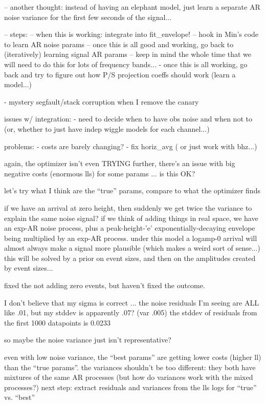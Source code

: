 \documentclass{article}
\begin{document}
-- another thought: instead of having an elephant model, just learn a separate AR noise variance for the first few seconds of the signal...
 
-- steps:
-- when this is working: integrate into fit_envelope!
-- hook in Min's code to learn AR noise params
-- once this is all good and working, go back to (iteratively) learning signal AR params
-- keep in mind the whole time that we will need to do this for lots of frequency bands...
- once this is all working, go back and try to figure out how P/S projection coeffs should work (learn a model...)


- mystery segfault/stack corruption when I remove the canary


issues w/ integration:
- need to decide when to have obs noise and when not to (or, whether to just have indep wiggle models for each channel...)

problems:
- costs are barely changing?
- fix horiz_avg ( or just work with bhz...)


again, the optimizer isn't even TRYING
further, there's an issue with big negative costs (enormous lls) for some params ... is this OK?

let's try what I think are the ``true'' params, compare to what the optimizer finds

if we have an arrival at zero height, then suddenly we get twice the variance to explain the same noise signal? 
if we think of adding things in real space, we have an exp-AR noise process, plus a peak-height-'e' exponentially-decaying envelope being multiplied by an exp-AR process.
under this model a logamp-0 arrival will almost always make a signal more plausible (which makes a weird sort of sense...)
this will be solved by a prior on event sizes, and then on the amplitudes created by event sizes...

fixed the not adding zero events, but haven't fixed the outcome.

I don't believe that my sigma is correct ... the noise residuals I'm seeing are ALL like .01, but my stddev is apparently .07? (var .005)
the stddev of residuals from the first 1000 datapoints is 0.0233

so maybe the noise variance just isn't representative?

even with low noise variance, the ``best params'' are getting lower costs (higher ll) than the ``true params''. 
the variances shouldn't be too different: they both have mixtures of the same AR processes (but how do variances work with the mixed processes?)
next step: extract residuals and variances from the lls logs for ``true'' vs. ``best''
\end{document}
